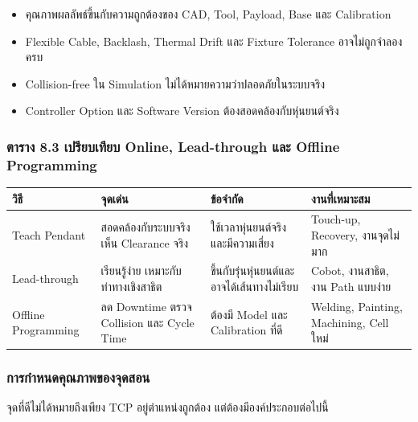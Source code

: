 \begin{itemize}
    \item คุณภาพผลลัพธ์ขึ้นกับความถูกต้องของ CAD, Tool, Payload, Base และ Calibration
    \item Flexible Cable, Backlash, Thermal Drift และ Fixture Tolerance อาจไม่ถูกจำลองครบ
    \item Collision-free ใน Simulation ไม่ได้หมายความว่าปลอดภัยในระบบจริง
    \item Controller Option และ Software Version ต้องสอดคล้องกับหุ่นยนต์จริง
\end{itemize}

\subsubsection{ตาราง 8.3 เปรียบเทียบ Online, Lead-through และ Offline Programming}

\begin{table}[htbp]
    \centering
    \small
    \begin{tabularx}{\textwidth}{@{}L{0.17\textwidth}L{0.26\textwidth}L{0.28\textwidth}Y@{}}
        \hline
        \textbf{วิธี} & \textbf{จุดเด่น} & \textbf{ข้อจำกัด} & \textbf{งานที่เหมาะสม} \\
        \hline
        Teach Pendant & สอดคล้องกับระบบจริง เห็น Clearance จริง & ใช้เวลาหุ่นยนต์จริงและมีความเสี่ยง & Touch-up, Recovery, งานจุดไม่มาก \\
        Lead-through & เรียนรู้ง่าย เหมาะกับท่าทางเชิงสาธิต & ขึ้นกับรุ่นหุ่นยนต์และอาจได้เส้นทางไม่เรียบ & Cobot, งานสาธิต, งาน Path แบบง่าย \\
        Offline Programming & ลด Downtime ตรวจ Collision และ Cycle Time & ต้องมี Model และ Calibration ที่ดี & Welding, Painting, Machining, Cell ใหม่ \\
        \hline
    \end{tabularx}
\end{table}

\subsubsection{การกำหนดคุณภาพของจุดสอน}

จุดที่ดีไม่ได้หมายถึงเพียง TCP อยู่ตำแหน่งถูกต้อง แต่ต้องมีองค์ประกอบต่อไปนี้

